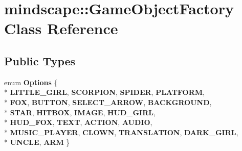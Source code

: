 \hypertarget{classmindscape_1_1_game_object_factory}{}\section{mindscape\+:\+:Game\+Object\+Factory Class Reference}
\label{classmindscape_1_1_game_object_factory}
\subsection*{Public Types}
\begin{DoxyCompactItemize}
\item 
enum {\bfseries Options} \{ \\*
{\bfseries L\+I\+T\+T\+L\+E\+\_\+\+G\+I\+RL}, 
{\bfseries S\+C\+O\+R\+P\+I\+ON}, 
{\bfseries S\+P\+I\+D\+ER}, 
{\bfseries P\+L\+A\+T\+F\+O\+RM}, 
\\*
{\bfseries F\+OX}, 
{\bfseries B\+U\+T\+T\+ON}, 
{\bfseries S\+E\+L\+E\+C\+T\+\_\+\+A\+R\+R\+OW}, 
{\bfseries B\+A\+C\+K\+G\+R\+O\+U\+ND}, 
\\*
{\bfseries S\+T\+AR}, 
{\bfseries H\+I\+T\+B\+OX}, 
{\bfseries I\+M\+A\+GE}, 
{\bfseries H\+U\+D\+\_\+\+G\+I\+RL}, 
\\*
{\bfseries H\+U\+D\+\_\+\+F\+OX}, 
{\bfseries T\+E\+XT}, 
{\bfseries A\+C\+T\+I\+ON}, 
{\bfseries A\+U\+D\+IO}, 
\\*
{\bfseries M\+U\+S\+I\+C\+\_\+\+P\+L\+A\+Y\+ER}, 
{\bfseries C\+L\+O\+WN}, 
{\bfseries T\+R\+A\+N\+S\+L\+A\+T\+I\+ON}, 
{\bfseries D\+A\+R\+K\+\_\+\+G\+I\+RL}, 
\\*
{\bfseries U\+N\+C\+LE}, 
{\bfseries A\+RM}
 \}\hypertarget{classmindscape_1_1_game_object_factory_a4d0d9ff633c21fc4f333f1c0ea6a2670}{}\label{classmindscape_1_1_game_object_factory_a4d0d9ff633c21fc4f333f1c0ea6a2670}

\end{DoxyCompactItemize}
